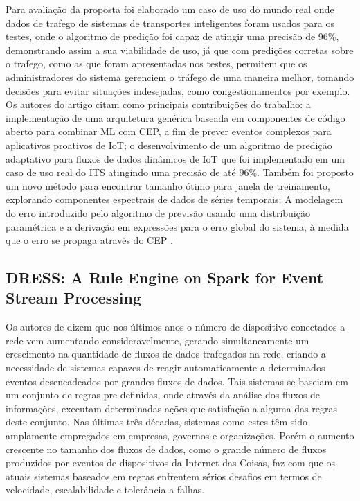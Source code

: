 \documentclass[ti,table]{texufpel} %
\begin{document}
     Para avaliação da proposta foi elaborado um caso de uso do mundo real onde dados de trafego de sistemas de transportes inteligentes foram usados para os testes, onde o algoritmo de predição foi capaz de atingir uma precisão de 96\%, demonstrando assim a sua viabilidade de uso, já que com predições corretas sobre o trafego, como as que foram apresentadas nos testes, permitem que os administradores do sistema gerenciem o tráfego de uma maneira melhor, tomando decisões para evitar situações indesejadas, como congestionamentos por exemplo.	 
	 Os autores do artigo citam como principais contribuições do trabalho:
	 a implementação de uma arquitetura genérica baseada em componentes de código aberto para combinar ML com CEP, a fim de prever eventos complexos para aplicativos proativos de IoT;
	 o desenvolvimento de um algoritmo de predição adaptativo para fluxos de dados dinâmicos de IoT que foi implementado em um caso de uso real do ITS atingindo uma precisão de até 96\%. Também foi proposto um novo método para encontrar tamanho ótimo para janela de treinamento, explorando componentes espectrais de dados de séries temporais;
	 A modelagem do erro introduzido pelo algoritmo de previsão usando uma distribuição paramétrica e a derivação em expressões para o erro global do sistema, à medida que o erro se propaga através do CEP \cite{art4akbar2017predictive}.



\subsection{DRESS: A Rule Engine on Spark for Event Stream Processing}


	Os autores de \cite{art5chen2016dress} dizem que nos últimos anos o número de dispositivo conectados a rede vem aumentando consideravelmente, gerando simultaneamente um crescimento na quantidade de fluxos de dados trafegados na rede, criando a necessidade de sistemas capazes de reagir automaticamente a determinados eventos desencadeados por grandes fluxos de dados. Tais sistemas se baseiam em um conjunto de regras pre definidas, onde através da análise dos fluxos de informações, executam determinadas ações que satisfação a alguma das regras deste conjunto. Nas últimas três décadas, sistemas como estes têm sido amplamente empregados em empresas, governos e organizações. Porém o aumento crescente no tamanho dos fluxos de dados, como o grande número de fluxos produzidos por eventos de dispositivos da Internet das Coisas, faz com que os atuais sistemas baseados em regras enfrentem sérios desafios em termos de velocidade, escalabilidade e tolerância a falhas.
	
\end{document}
